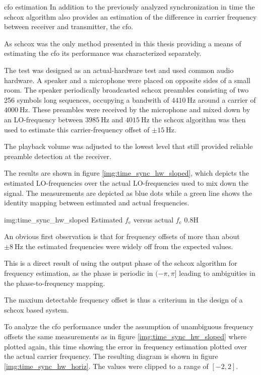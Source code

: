 \begin{subchapter}{\Acrlong{cfo} estimation}
  In addition to the previously analyzed synchronization in time
  the \gls{schcox} algorithm also provides an estimation of
  the difference in carrier frequency between receiver and
  transmitter, the \acrfull{cfo}.

  As \gls{schcox} was the only method presented in this thesis
  providing a means of estimating the \gls{cfo}
  its performance was characterized separately.

  The test was designed as an actual-hardware test
  and used common audio hardware.
  A speaker and a microphone were placed on opposite
  sides of a small room. The speaker periodically broadcasted
  \gls{schcox} preambles consisting of two 256 symbols long
  sequences, occupying a bandwith of $\SI{4410}{\hertz}$
  around a carrier of $\SI{4000}{\hertz}$.
  These preambles were received by the microphone and mixed
  down by an LO-frequency between $\SI{3985}{\hertz}$ and $\SI{4015}{\hertz}$
  the \gls{schcox} algorithm was then used to estimate
  this carrier-frequency offset of $\pm\SI{15}{\hertz}$.

  The playback volume was adjusted to the lowest level
  that still provided reliable preamble detection at the receiver.

  The results are shown in figure \ref{img:time_sync_hw_sloped},
  which depicts the estimated LO-frequencies over the
  actual LO-frequencies used to mix down the signal.
  The measurements are depicted as blue dots while a
  green line shows the identity mapping between estimated
  and actual frequencies.

                  {img:time_sync_hw_sloped}
                  {Estimated $f_\text{c}$ versus actual $f_\text{c}$}
                  {0.8}{H}

  An obvious first observation is that for frequency offsets of
  more than about $\pm\SI{8}{\hertz}$ the estimated frequencies
  were widely off from the expected values.

  This is a direct result of using the output phase
  of the \gls{schcox} algorithm for frequency estimation,
  as the phase is periodic in $(-\pi, \pi]$ leading to
  ambiguities in the phase-to-frequency mapping.

  The maxium detectable frequency offset is thus
  a criterium in the design of a \gls{schcox}
  based system.

  To analyze the \gls{cfo} performance under the assumption
  of unambiguous frequency offsets the same measurements
  as in figure \ref{img:time_sync_hw_sloped} where plotted
  again, this time showing the error in frequency estimation
  plotted over the actual carrier frequency.
  The resulting diagram is shown in
  figure \ref{img:time_sync_hw_horiz}.
  The values were clipped to a range of $[-2, 2]$.


\end{subchapter}
